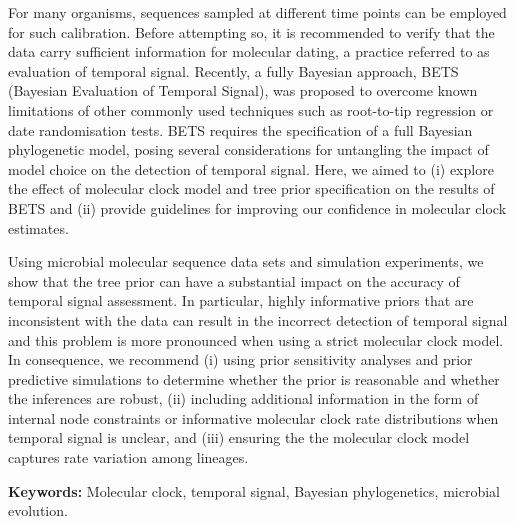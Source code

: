 \documentclass[10pt,letterpaper]{article}
\begin{document}
For many organisms, sequences sampled at different time points can be employed for such calibration. Before attempting so, it is recommended to verify that the data carry sufficient information for molecular dating, a practice referred to as evaluation of temporal signal. Recently, a fully Bayesian approach, BETS (Bayesian Evaluation of Temporal Signal), was proposed to overcome known limitations of other commonly used techniques such as root-to-tip regression or date randomisation tests. BETS requires the specification of a full Bayesian phylogenetic model, posing several considerations for untangling the impact of model choice on the detection of temporal signal. Here, we aimed to (i) explore the effect of molecular clock model and tree prior specification on the results of BETS and (ii) provide guidelines for improving our confidence in molecular clock estimates. 

Using microbial molecular sequence data sets and simulation experiments, we show that the tree prior can have a substantial impact on the accuracy of temporal signal assessment. In particular, highly informative priors that are inconsistent with the data can result in the incorrect detection of temporal signal and this problem is more pronounced when using a strict molecular clock model. In consequence, we recommend (i) using prior sensitivity analyses and prior predictive simulations to determine whether the prior is reasonable and whether the inferences are robust, (ii) including additional information in the form of internal node constraints or informative molecular clock rate distributions when temporal signal is unclear, and (iii) ensuring the the molecular clock model captures rate variation among lineages.
\newline

\textbf{Keywords:} Molecular clock, temporal signal, Bayesian phylogenetics, microbial evolution. 



\end{document}
